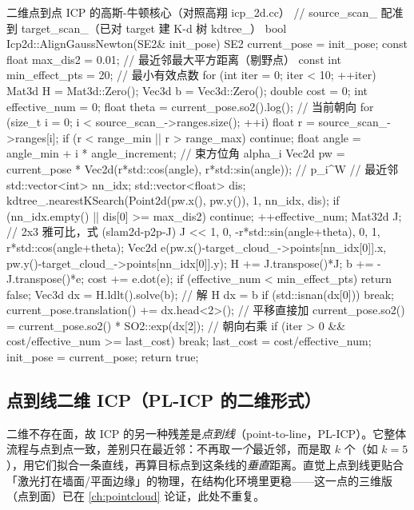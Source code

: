 \begin{codebox}[C++]{二维点到点 ICP 的高斯-牛顿核心（对照高翔 icp\_2d.cc）}
// source_scan_ 配准到 target_scan_（已对 target 建 K-d 树 kdtree_）
bool Icp2d::AlignGaussNewton(SE2& init_pose) {
  SE2 current_pose = init_pose;
  const float max_dis2 = 0.01;     // 最近邻最大平方距离（剔野点）
  const int   min_effect_pts = 20; // 最小有效点数
  for (int iter = 0; iter < 10; ++iter) {
    Mat3d H = Mat3d::Zero(); Vec3d b = Vec3d::Zero();
    double cost = 0; int effective_num = 0;
    float theta = current_pose.so2().log();          // 当前朝向
    for (size_t i = 0; i < source_scan_->ranges.size(); ++i) {
      float r = source_scan_->ranges[i];
      if (r < range_min || r > range_max) continue;
      float angle = angle_min + i * angle_increment;  // 束方位角 alpha_i
      Vec2d pw = current_pose * Vec2d(r*std::cos(angle), r*std::sin(angle)); // p_i^W
      // 最近邻
      std::vector<int> nn_idx; std::vector<float> dis;
      kdtree_.nearestKSearch(Point2d(pw.x(), pw.y()), 1, nn_idx, dis);
      if (nn_idx.empty() || dis[0] >= max_dis2) continue;
      ++effective_num;
      Mat32d J;                                       // 2x3 雅可比，式 (slam2d-p2p-J)
      J << 1, 0, -r*std::sin(angle+theta),
           0, 1,  r*std::cos(angle+theta);
      Vec2d e(pw.x()-target_cloud_->points[nn_idx[0]].x,
              pw.y()-target_cloud_->points[nn_idx[0]].y);
      H += J.transpose()*J;  b += -J.transpose()*e;   cost += e.dot(e);
    }
    if (effective_num < min_effect_pts) return false;
    Vec3d dx = H.ldlt().solve(b);                     // 解 H dx = b
    if (std::isnan(dx[0])) break;
    current_pose.translation() += dx.head<2>();       // 平移直接加
    current_pose.so2() = current_pose.so2() * SO2::exp(dx[2]); // 朝向右乘
    if (iter > 0 && cost/effective_num >= last_cost) break;
    last_cost = cost/effective_num;
  }
  init_pose = current_pose;  return true;
}
\end{codebox}

\subsection{点到线二维 ICP（PL-ICP 的二维形式）}
\label{sec:slam2d-p2l}

二维不存在面，故 ICP 的另一种残差是\emph{点到线}（point-to-line，PL-ICP\cite{censi2008plicp}）。它整体流程与点到点一致，差别只在最近邻：不再取\emph{一个}最近邻，而是取 $k$ 个（如 $k=5$），用它们拟合一条直线，再算目标点到这条线的\emph{垂直}距离。直觉上点到线更贴合「激光打在墙面/平面边缘」的物理，在结构化环境里更稳——这一点的三维版（点到面）已在 \cref{ch:pointcloud} 论证，此处不重复。

